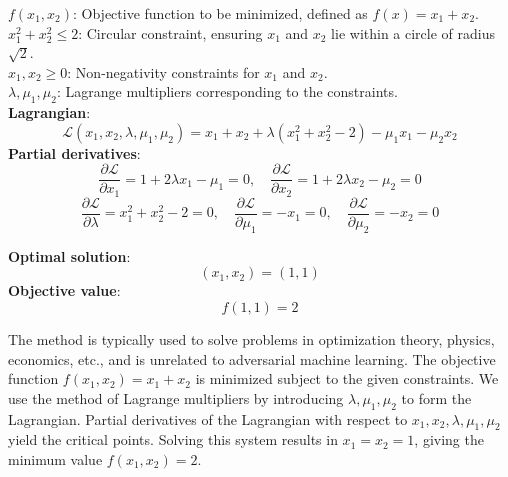 \textbf{$f(x_1, x_2)$}: Objective function to be minimized, defined as $f(x) = x_1 + x_2$. \\
\textbf{$x_1^2 + x_2^2 \leq 2$}: Circular constraint, ensuring $x_1$ and $x_2$ lie within a circle of radius $\sqrt{2}$. \\
\textbf{$x_1, x_2 \geq 0$}: Non-negativity constraints for $x_1$ and $x_2$. \\
\textbf{$\lambda, \mu_1, \mu_2$}: Lagrange multipliers corresponding to the constraints. \\

\textbf{Lagrangian}:
\[
\mathcal{L}(x_1, x_2, \lambda, \mu_1, \mu_2) = x_1 + x_2 + \lambda (x_1^2 + x_2^2 - 2) - \mu_1 x_1 - \mu_2 x_2
\]
\textbf{Partial derivatives}:
\[
\frac{\partial \mathcal{L}}{\partial x_1} = 1 + 2\lambda x_1 - \mu_1 = 0, \quad
\frac{\partial \mathcal{L}}{\partial x_2} = 1 + 2\lambda x_2 - \mu_2 = 0
\]
\[
\frac{\partial \mathcal{L}}{\partial \lambda} = x_1^2 + x_2^2 - 2 = 0, \quad
\frac{\partial \mathcal{L}}{\partial \mu_1} = -x_1 = 0, \quad
\frac{\partial \mathcal{L}}{\partial \mu_2} = -x_2 = 0
\]

\textbf{Optimal solution}: 
\[
(x_1, x_2) = (1, 1)
\]
\textbf{Objective value}:
\[
f(1, 1) = 2
\]

The method is typically used to solve problems in optimization theory, physics, economics, etc., and is unrelated to adversarial machine learning. The objective function $f(x_1, x_2) = x_1 + x_2$ is minimized subject to the given constraints. We use the method of Lagrange multipliers by introducing $\lambda, \mu_1, \mu_2$ to form the Lagrangian. Partial derivatives of the Lagrangian with respect to $x_1, x_2, \lambda, \mu_1, \mu_2$ yield the critical points. Solving this system results in $x_1 = x_2 = 1$, giving the minimum value $f(x_1, x_2) = 2$.

